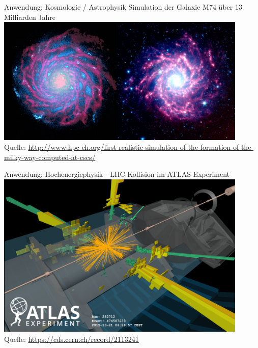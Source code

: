 \documentclass[xcolor=dvipsnames]{beamer}
\begin{document}
\begin{frame}{Anwendung: Kosmologie / Astrophysik}
  \centering
  Simulation der Galaxie M74 über 13 Milliarden Jahre\\ \vspace{0.2cm}
  \includegraphics[width=0.9\textwidth]{graphics/m74_simulation.png}\\
  {\small Quelle: \url{http://www.hpc-ch.org/first-realistic-simulation-of-the-formation-of-the-milky-way-computed-at-cscs/} }  
\end{frame}

\begin{frame}{Anwendung: Hochenergiephysik - LHC}
  \centering
  Kollision im ATLAS-Experiment\\ \vspace{0.2cm}
  \includegraphics[width=0.9\textwidth]{graphics/atlas_event.png}\\
  {\small Quelle: \url{ https://cds.cern.ch/record/2113241 } }
\end{frame}
\end{document}
